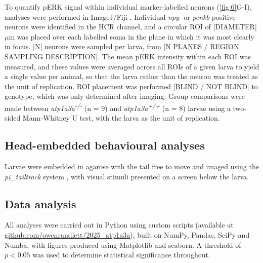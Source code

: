\documentclass[9.5pt,lineno]{RandlettLab_elife}
\begin{document}
To quantify pERK signal within individual marker-labelled neurons (\autoref{fig:6}G-I), analyses were performed in ImageJ/Fiji \citep{Schindelin2012-hd}.
Individual \emph{npy}- or \emph{penkb}-positive neurons were identified in the HCR channel, and a circular ROI of [DIAMETER] $\mu$m was placed over each labelled soma in the plane in which it was most clearly in focus.
[N] neurons were sampled per larva, from [N PLANES / REGION SAMPLING DESCRIPTION].
The mean pERK intensity within each ROI was measured, and these values were averaged across all ROIs of a given larva to yield a single value per animal, so that the larva rather than the neuron was treated as the unit of replication.
ROI placement was performed [BLIND / NOT BLIND] to genotype, which was only determined after imaging.
Group comparisons were made between \emph{atp1a3a\textsuperscript{-/-}} (n = 9) and \emph{atp1a3a\textsuperscript{+/+}} (n = 8) larvae using a two-sided Mann-Whitney U test, with the larva as the unit of replication.

\subsection{Head-embedded behavioural analyses}
Larvae were embedded in agarose with the tail free to move and imaged using the \emph{pi\_tailtrack} system \citep{Randlett2023}, with visual stimuli presented on a screen below the larva.

\subsection{Data analysis}
All analyses were carried out in Python using custom scripts (available at \href{https://github.com/owenrandlett/2025_atp1a3a}{github.com/owenrandlett/2025\_atp1a3a}), built on NumPy, Pandas, SciPy and Numba, with figures produced using Matplotlib and seaborn.
A threshold of $p < 0.05$ was used to determine statistical significance throughout.
\end{document}
